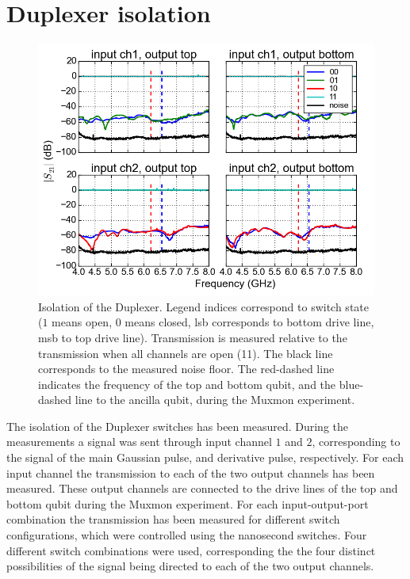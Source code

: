 \chapter{Duplexer isolation}
  \label{ch:Duplexer isolation}

  \begin{figure}[h]
    \centering
    \includegraphics[width=\textwidth]{Figures/Appendix/Duplexer isolation.png}
    \caption{Isolation of the Duplexer. Legend indices correspond to switch state ($1$ means open, $0$ means closed, lsb corresponds to bottom drive line, msb to top drive line). Transmission is measured relative to the transmission when all channels are open (11). The black line corresponds to the measured noise floor. The red-dashed line indicates the frequency of the top and bottom qubit, and the blue-dashed line to the ancilla qubit, during the Muxmon experiment.}
    \label{fig:Duplexer isolation}
  \end{figure}

  The isolation of the Duplexer switches has been measured. During the measurements a signal was sent through input channel $1$ and $2$, corresponding to the signal of the main Gaussian pulse, and derivative pulse, respectively. For each input channel the transmission to each of the two output channels has been measured. These output channels are connected to the drive lines of the top and bottom qubit during the Muxmon experiment. For each input-output-port combination the transmission has been measured for different switch configurations, which were controlled using the nanosecond switches. Four different switch combinations were used, corresponding the the four distinct possibilities of the signal being directed to each of the two output channels.

